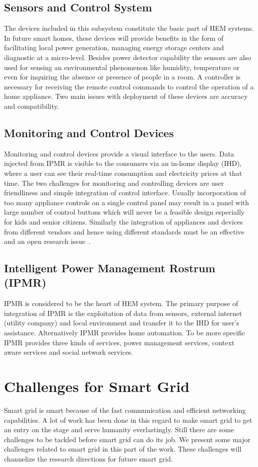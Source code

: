 \documentclass[journal]{IEEEtran}
\begin{document}
\subsection{Sensors and Control System}
The devices included in this subsystem constitute the basic part of HEM systems. In future smart homes, these devices will provide benefits in the form of facilitating local power generation, managing energy storage centers and diagnostic at a micro-level. Besides power detector capability the sensors are also used for sensing an environmental phenomenon like humidity, temperature or even for inquiring the absence or presence of people in a room. A controller is necessary for receiving the remote control commands to control the operation of a home appliance. Two main issues with deployment of these devices are accuracy and compatibility.\\
\subsection{Monitoring and Control Devices}
Monitoring and control devices provide a visual interface to the users. Data injected from IPMR is visible to the consumers via an in-home display (IHD), where a user can see their real-time consumption and electricity prices at that time. The two challenges for monitoring and controlling devices are user friendliness and simple integration of control interface. Usually incorporation of too many appliance controls on a single control panel may result in a panel with large number of control buttons which will never be a feasible design especially for kids and senior citizens. Similarly the integration of appliances and devices from different vendors and hence using different standards must be an effective and an open research issue~\cite{kailas2012survey}.\\
\subsection{Intelligent Power Management Rostrum (IPMR)}
IPMR is considered to be the heart of HEM system. The primary purpose of integration of IPMR is the exploitation of data from sensors, external internet (utility company) and local environment and transfer it to the IHD for user's assistance. Alternatively IPMR provides home automation. To be more specific IPMR provides three kinds of services, power management services, context aware services and social network services.\\
\section{Challenges for Smart Grid}
Smart grid is smart because of the fast communication and efficient networking capabilities. A lot of work has been done in this regard to make smart grid to get an entry on the stage and serve humanity everlastingly. Still there are some challenges to be tackled before smart grid can do its job. We present some major challenges related to smart grid in this part of the work. These challenges will channelize the research directions for future smart grid.\\
\end{document}

